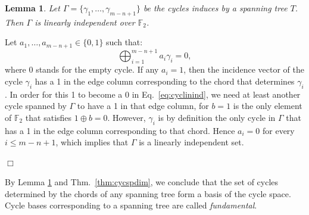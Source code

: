\documentclass[a4paper]{book}
\theoremstyle{changebreak}                %
\newtheorem{lem}[result]{Lemma}
\newenvironment{proof}
 {{\sl Proof.}\hspace*{1 ex}}%
 {{\nopagebreak\hspace*{\fill}$\Box$\par\vspace{12pt}}}
\begin{document}
\begin{lem}
Let $\Gamma=\{\gamma_1,\ldots,\gamma_{m-n+1}\}$ be the cycles induces
by a spanning tree $T$. Then $\Gamma$ is linearly
independent over $\mathbb{F}_2$.
\label{lem:cyclinind}
\end{lem}
\begin{proof}
Let $a_1,\ldots,a_{m-n+1}\in\{0,1\}$ such that:
\begin{equation}
  \bigoplus_{i=1}^{m-n+1} a_i\gamma_i = 0, \label{eq:cyclinind}
\end{equation}
where 0 stands for the empty cycle. If any $a_i=1$, then the incidence
vector of the cycle $\gamma_i$ has a 1 in the edge
column corresponding to the chord that determines
$\gamma_i$. In order for this 1 to become a 0 in
Eq.~\eqref{eq:cyclinind}, we need at least another cycle spanned by
$\Gamma$ to have a 1 in that edge column, for $b=1$ is the only
element of $\mathbb{F}_2$ that satisfies $1\oplus b = 0$. However,
$\gamma_i$ is by definition the only cycle in $\Gamma$ that has a 1 in
the edge column corresponding to that chord. Hence $a_i=0$ for every
$i\le m-n+1$, which implies that $\Gamma$ is a linearly independent
set.
\end{proof}

By Lemma \ref{lem:cyclinind} and Thm.~\ref{thm:cycspdim}, we conclude
that the set of cycles determined by the chords of
any spanning tree form a basis of the cycle space. Cycle
bases corresponding to a spanning
tree are called {\it
  fundamental}.
\end{document}
